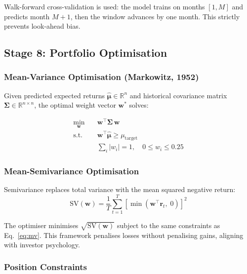 \documentclass[12pt, a4paper]{article}
\begin{document}
Walk-forward cross-validation is used: the model trains on months $[1, M]$ and predicts month $M+1$, then the window advances by one month. This strictly prevents look-ahead bias.

\subsection{Stage 8: Portfolio Optimisation}

\subsubsection{Mean-Variance Optimisation (Markowitz, 1952)}

Given predicted expected returns $\hat{\boldsymbol{\mu}} \in \mathbb{R}^n$ and historical covariance matrix $\boldsymbol{\Sigma} \in \mathbb{R}^{n \times n}$, the optimal weight vector $\mathbf{w}^*$ solves:

\begin{equation}
\begin{aligned}
    \min_{\mathbf{w}} \quad & \mathbf{w}^\top \boldsymbol{\Sigma}\, \mathbf{w} \\
    \text{s.t.} \quad & \mathbf{w}^\top \hat{\boldsymbol{\mu}} \geq \mu_{\text{target}} \\
                      & \sum_i |w_i| = 1, \quad 0 \leq w_i \leq 0.25
\end{aligned}
\label{eq:mv}
\end{equation}

\subsubsection{Mean-Semivariance Optimisation}

Semivariance replaces total variance with the mean squared negative return:
\begin{equation}
    \text{SV}(\mathbf{w}) = \frac{1}{T}\sum_{t=1}^{T}\left[\min\!\left(\mathbf{w}^\top \mathbf{r}_t,\; 0\right)\right]^2
\label{eq:sv}
\end{equation}

The optimiser minimises $\sqrt{\text{SV}(\mathbf{w})}$ subject to the same constraints as Eq.~\ref{eq:mv}. This framework penalises losses without penalising gains, aligning with investor psychology.

\subsubsection{Position Constraints}
\end{document}

